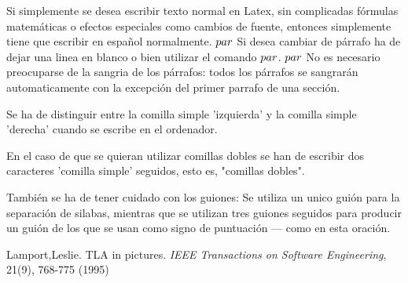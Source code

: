 \documentclass[a4paper,12pt]{article}
\begin{document}
Si simplemente se desea escribir texto normal en Latex,
sin complicadas f\'ormulas matem\'aticas o efectos especiales
como cambios de fuente, entonces simplemente tiene que escribir
en espa\~nol normalmente.
$\\par$
Si desea cambiar de párrafo ha de dejar una linea en blanco o bien
utilizar el comando $\\par$.
$\\par$
No es necesario preocuparse de la sangria de los párrafos:
todos los párrafos se sangrarán automaticamente con la excepción 
del primer parrafo de una sección.

Se ha de distinguir entre la comilla simple 'izquierda'
y la comilla simple 'derecha' cuando se escribe en el ordenador.

En el caso de que se quieran utilizar comillas dobles se han de 
escribir dos caracteres 'comilla simple' seguidos, esto es,
"comillas dobles".

También se ha de tener cuidado con los guiones: Se utiliza un unico
guión para la separación de silabas, mientras que se utilizan 
tres guiones seguidos para producir un guión de los que se usan
como signo de puntuación --- como en esta oración.
\begin{thebibliography}{00}
   Lamport,Leslie.
   TLA in pictures.
   \emph{IEEE Transactions on Software Engineering},
   21(9), 768-775
   (1995)
\end{thebibliography}   
\end{document}

